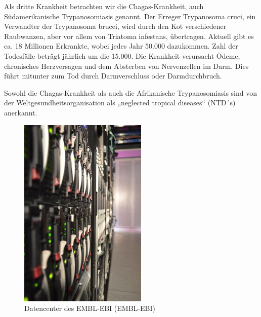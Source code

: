\documentclass[11pt]{article}
\begin{document}
    Als dritte Krankheit betrachten wir die Chagas-Krankheit, auch Südamerikanische Trypanosomiasis genannt. Der Erreger Trypanosoma cruci, ein Verwandter der Trypanosoma brucei, wird durch den Kot verschiedener Raubwanzen, aber vor allem von Triatoma infestans, übertragen. Aktuell gibt es ca. 18 Millionen Erkrankte, wobei jedes Jahr 50.000 dazukommen. Zahl der Todesfälle beträgt jährlich um die 15.000. Die Krankheit verursacht Ödeme, chronisches Herzversagen und dem Absterben von Nervenzellen im Darm. Dies führt mitunter zum Tod durch Darmverschluss oder Darmdurchbruch.

    Sowohl die Chagas-Krankheit als auch die Afrikanische Trypanosomiasis sind von der Weltgesundheitsorganisation als „neglected tropical diseases“ (NTD´s) anerkannt.

        \begin{figure}
            \includegraphics[width=\linewidth]{Datacenter}
            \caption{Datencenter des EMBL-EBI (EMBL-EBI)}
        \end{figure}
\end{document}
